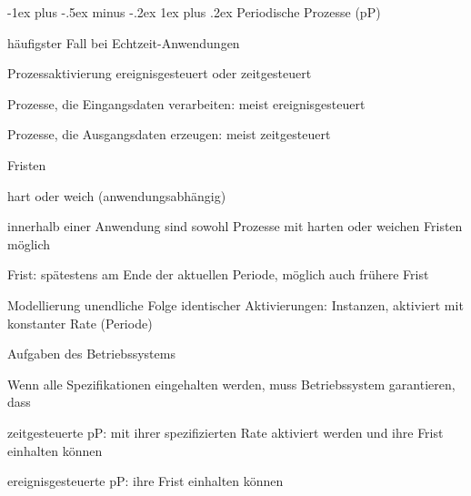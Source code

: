 \documentclass[a4paper]{article}
\makeatletter
\renewcommand{\subsubsection}{\@startsection{subsubsection}{3}{0mm}%
 {-1ex plus -.5ex minus -.2ex}%
 {1ex plus .2ex}%
 {\normalfont\small\bfseries}}
\makeatother
\begin{document}
\begin{multicols}{3}
    \subsubsection{Periodische Prozesse (pP)}
    \begin{description*}
        \item häufigster Fall bei Echtzeit-Anwendungen
        \item[Prozessaktivierung] ereignisgesteuert oder zeitgesteuert
        \item Prozesse, die Eingangsdaten verarbeiten: meist ereignisgesteuert
        \item Prozesse, die Ausgangsdaten erzeugen: meist zeitgesteuert
        \item[Fristen]
        \begin{itemize*}
            \item hart oder weich (anwendungsabhängig)
            \item innerhalb einer Anwendung sind sowohl Prozesse mit harten oder weichen Fristen möglich
            \item Frist: spätestens am Ende der aktuellen Periode, möglich auch frühere Frist
        \end{itemize*}
        \item[Modellierung] unendliche Folge identischer Aktivierungen: Instanzen, aktiviert mit konstanter Rate (Periode)
        \item[Aufgaben des Betriebssystems]
        \begin{itemize*}
            \item Wenn alle Spezifikationen eingehalten werden, muss Betriebssystem garantieren, dass
            \item zeitgesteuerte pP: mit ihrer spezifizierten Rate aktiviert werden und ihre Frist einhalten können
            \item ereignisgesteuerte pP: ihre Frist einhalten können
        \end{itemize*}
    \end{description*}


\end{multicols}
\end{document}
